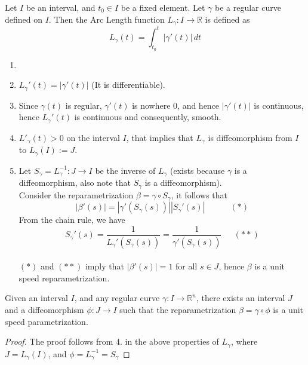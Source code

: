 \vspace{0.4cm}
\begin{definition}
    Let $I$ be an interval, and $t_{0}\in I$ be a fixed element. Let $\gamma$ be a regular curve defined on $I$. Then the Arc Length function $L_{\gamma}:I\to\mathbb{R}$ is defined as $$L_{\gamma}(t)=\int_{t_{0}}^{t}|\gamma'(t)|\,dt$$
\end{definition}
\vspace{0.4cm}
\begin{property}
    \begin{enumerate}
        \item []
        \item $L_{\gamma}'(t)=|\gamma'(t)|$ (It is differentiable).
        \item Since $\gamma(t)$ is regular, $\gamma'(t)$ is nowhere $0$, and hence $|\gamma'(t)|$ is continuous, hence $L_{\gamma}'(t)$ is continuous and consequently, smooth.
        \item $L'_{\gamma}(t)>0$ on the interval $I$, that implies that $L_{\gamma}$ is diffeomorphism from $I$ to $L_{\gamma}(I):=J$.
        \item Let $S_{\gamma}=L_{\gamma}^{-1}:J\to I$ be the inverse of $L_{\gamma}$ (exists because $\gamma$ is a diffeomorphism, also note that $S_{\gamma}$ is a diffeomorphism).\\ 
            Consider the reparametrization $\beta=\gamma\circ S_{\gamma}$, it follows that $$|\beta'(s)|=|\gamma'(S_{\gamma}(s))||S_{\gamma}'(s)|\quad\quad\quad(*)$$
            From the chain rule, we have $$S_{\gamma}'(s)=\frac{1}{L_{\gamma}'(S_{\gamma}(s))}=\frac{1}{\gamma'(S_{\gamma}(s))}\quad~~(**)$$\\ 
            $(*)$ and $(**)$ imply that $|\beta'(s)|=1$ for all $s\in J$, hence $\beta$ is a unit speed reparametrization.
    \end{enumerate}
\end{property}
\vspace{0.4cm}
\begin{theorem}[]
    Given an interval $I$, and any regular curve $\gamma:I\to\mathbb{R}^{n}$, there exists an interval $J$ and a diffeomorphism $\phi:J\to I$ such that the reparametrization $\beta=\gamma\circ\phi$ is a unit speed parametrization.
\end{theorem}
\begin{proof}
    The proof follows from $4.$ in the above properties of $L_{\gamma}$, where\\
    $J = L_{\gamma}(I)$, and $\phi = L_{\gamma}^{-1}=S_{\gamma}$
\end{proof}
\vspace{0.4cm}
